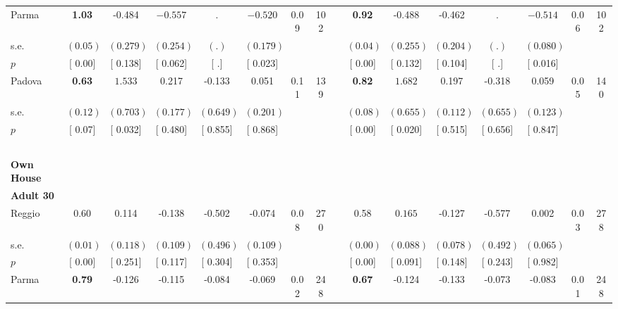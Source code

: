 \begin{longtable}{L{8em} c c c c c c c p{1em} c c c c c c c}
\quad \quad \quad Parma& \textbf{     1.03} &    -0.484 & $ \mathbf{   -0.557}$ &         . & $ \mathbf{   -0.520}$ &      0.09 &       102 & & \textbf{     0.92} &    -0.488 &    -0.462 &         . & $ \mathbf{   -0.514}$ &      0.06 &       102  \\*
\quad \quad \quad \quad s.e.& $ (     0.05)$ & $ (    0.279)$ & $ (    0.254)$ & $ (        .)$ & $ (    0.179)$ & & & & $ (     0.04)$ & $ (    0.255)$ & $ (    0.204)$ & $ (        .)$ & $ (    0.080)$ & &  \\*
\quad \quad \quad \quad $ p$ & [     0.00] & [    0.138] & [    0.062] & [        .] & [    0.023] & & & & [     0.00] & [    0.132] & [    0.104] & [        .] & [    0.016] & &  \\[1em]
\quad \quad \quad Padova& \textbf{     0.63} & $ \mathbf{    1.533}$ &     0.217 &    -0.133 &     0.051 &      0.11 &       139 & & \textbf{     0.82} & $ \mathbf{    1.682}$ &     0.197 &    -0.318 &     0.059 &      0.05 &       140  \\*
\quad \quad \quad \quad s.e.& $ (     0.12)$ & $ (    0.703)$ & $ (    0.177)$ & $ (    0.649)$ & $ (    0.201)$ & & & & $ (     0.08)$ & $ (    0.655)$ & $ (    0.112)$ & $ (    0.655)$ & $ (    0.123)$ & &  \\*
\quad \quad \quad \quad $ p$ & [     0.07] & [    0.032] & [    0.480] & [    0.855] & [    0.868] & & & & [     0.00] & [    0.020] & [    0.515] & [    0.656] & [    0.847] & &  \\[1em]
~\\[1em]
\textbf{Own House} \\*
\quad \quad \textbf{Adult 30} & & & & & & & & & & & & & & & \\* 
\quad \quad \quad Reggio& 0.60 &     0.114 &    -0.138 &    -0.502 &    -0.074 &      0.08 &       270 & & 0.58 & $ \mathbf{    0.165}$ &    -0.127 &    -0.577 &     0.002 &      0.03 &       278  \\*
\quad \quad \quad \quad s.e.& $ (     0.01)$ & $ (    0.118)$ & $ (    0.109)$ & $ (    0.496)$ & $ (    0.109)$ & & & & $ (     0.00)$ & $ (    0.088)$ & $ (    0.078)$ & $ (    0.492)$ & $ (    0.065)$ & &  \\*
\quad \quad \quad \quad $ p$ & [     0.00] & [    0.251] & [    0.117] & [    0.304] & [    0.353] & & & & [     0.00] & [    0.091] & [    0.148] & [    0.243] & [    0.982] & &  \\[1em]
\quad \quad \quad Parma& \textbf{     0.79} &    -0.126 &    -0.115 &    -0.084 &    -0.069 &      0.02 &       248 & & \textbf{     0.67} &    -0.124 &    -0.133 &    -0.073 &    -0.083 &      0.01 &       248  \\*

\end{longtable}
